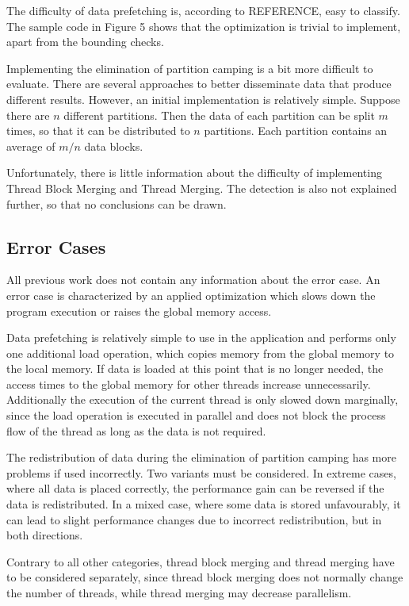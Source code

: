 \documentclass[conference]{IEEEtran}
\begin{document}
		The difficulty of data prefetching is, according to REFERENCE, easy to classify. The sample code in Figure 5 shows that the optimization is trivial to implement, apart from the bounding checks.
		
		Implementing the elimination of partition camping is a bit more difficult to evaluate. There are several approaches to better disseminate data that produce different results. However, an initial implementation is relatively simple. 
		Suppose there are $n$ different partitions. Then the data of each partition can be split $m$ times, so that it can be distributed to $n$ partitions. Each partition contains an average of $m/n$ data blocks.
		
		
		Unfortunately, there is little information about the difficulty of implementing Thread Block Merging and Thread Merging. The detection is also not explained further, so that no conclusions can be drawn.
		
	
	\subsection{Error Cases}
	
		All previous work does not contain any information about the error case. An error case is characterized by an applied optimization which slows down the program execution or raises the global memory access.
		
		Data prefetching is relatively simple to use in the application and performs only one additional load operation, which copies memory from the global memory to the local memory. If data is loaded at this point that is no longer needed, the access times to the global memory for other threads increase unnecessarily. Additionally the execution of the current thread is only slowed down marginally, since the load operation is executed in parallel and does not block the process flow of the thread as long as the data is not required.
		
		The redistribution of data during the elimination of partition camping has more problems if used incorrectly. Two variants must be considered.
		In extreme cases, where all data is placed correctly, the performance gain can be reversed if the data is redistributed. 
		In a mixed case, where some data is stored unfavourably, it can lead to slight performance changes due to incorrect redistribution, but in both directions.

		Contrary to all other categories, thread block merging and thread merging have to be considered separately, since thread block merging does not normally change the number of threads, while thread merging may decrease parallelism.
		
\end{document}
